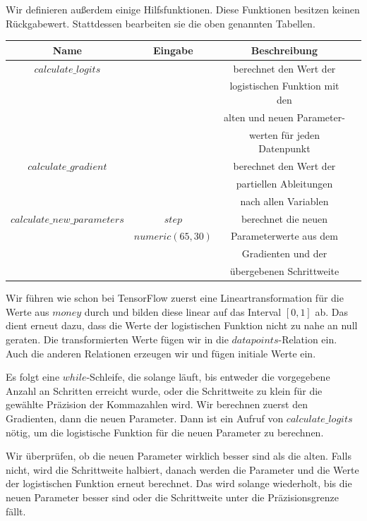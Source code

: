 Wir definieren außerdem einige Hilfsfunktionen. Diese Funktionen besitzen keinen Rückgabewert. Stattdessen bearbeiten sie die oben genannten Tabellen.
\begin{center}
  \begin{tabular}{|c|c|c|c|}\hline
    \textbf{Name} & \textbf{Eingabe} & \textbf{Beschreibung} \\ \hline
    $calculate\_logits$ & & berechnet den Wert der \\
    & & logistischen Funktion mit den \\
    & & alten und neuen Parameter- \\
    & & werten für jeden Datenpunkt \\ \hline
    $calculate\_gradient$ & & berechnet den Wert der \\
    & & partiellen Ableitungen \\
    & & nach allen Variablen \\ \hline
    $calculate\_new\_parameters$ & $step$ & berechnet die neuen \\
    & $numeric(65, 30)$ & Parameterwerte aus dem \\
    & & Gradienten und der \\
    & & übergebenen Schrittweite \\ \hline
  \end{tabular}
\end{center}

Wir führen wie schon bei TensorFlow zuerst eine Lineartransformation für die Werte aus $money$ durch und bilden diese linear auf das Interval $[0, 1]$ ab. Das dient erneut dazu, dass die Werte der logistischen Funktion nicht zu nahe an null geraten. Die transformierten Werte fügen wir in die $datapoints$-Relation ein. Auch die anderen Relationen erzeugen wir und fügen initiale Werte ein.

Es folgt eine $while$-Schleife, die solange läuft, bis entweder die vorgegebene Anzahl an Schritten erreicht wurde, oder die Schrittweite zu klein für die gewählte Präzision der Kommazahlen wird. Wir berechnen zuerst den Gradienten, dann die neuen Parameter. Dann ist ein Aufruf von $calculate\_logits$ nötig, um die logistische Funktion für die neuen Parameter zu berechnen.

Wir überprüfen, ob die neuen Parameter wirklich besser sind als die alten. Falls nicht, wird die Schrittweite halbiert, danach werden die Parameter und die Werte der logistischen Funktion erneut berechnet. Das wird solange wiederholt, bis die neuen Parameter besser sind oder die Schrittweite unter die Präzisionsgrenze fällt.

